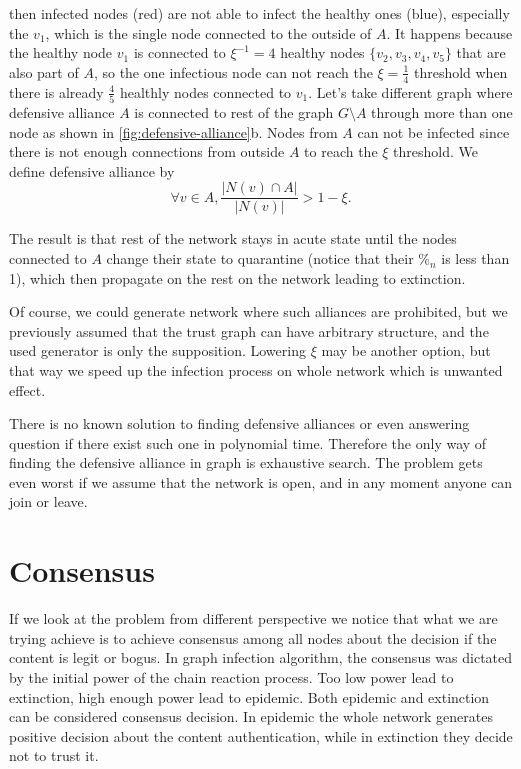\documentclass[nostrict]{szablonPG}
\begin{document}
then infected nodes (red) are not able to infect the healthy ones (blue), especially the $v_1$, which is the single node connected to the outside of $A$. It happens because the healthy node $v_1$ is connected to $\xi^{-1} = 4$ healthy nodes $\{v_2,v_3,v_4,v_5\}$ that are also part of $A$, so the one infectious node can not reach the $\xi = \frac{1}{4}$ threshold when there is already $\frac{4}{5}$ healthly nodes connected to $v_1$.
Let's take different graph where defensive alliance $A$ is connected to rest of the graph $G \setminus A$ through more than one node as shown in \ref{fig:defensive-alliance}b. Nodes from $A$ can not be infected since there is not enough connections from outside $A$ to reach the $\xi$ threshold. We define defensive alliance by \[\forall{v \in A}, \frac{|N(v) \cap A|}{|N(v)|} > 1 - \xi.\]

The result is that rest of the network stays in acute state until the nodes connected to $A$ change their state to quarantine (notice that their $\%_n$ is less than 1), which then propagate on the rest on the network leading to extinction. 

Of course, we could generate network where such alliances are prohibited, but we previously assumed that the trust graph can have arbitrary structure, and the used generator is only the supposition. Lowering $\xi$ may be another option, but that way we speed up the infection process on whole network which is unwanted effect.

There is no known solution to finding defensive alliances or even answering question if there exist such one in polynomial time. Therefore the only way of finding the defensive alliance in graph is exhaustive search. The problem gets even worst if we assume that the network is open, and in any moment anyone can join or leave. 

\section{Consensus}
If we look at the problem from different perspective we notice that what we are trying achieve is to achieve consensus among all nodes about the decision if the content is legit or bogus. In graph infection algorithm, the consensus was dictated by the initial power of the chain reaction process. Too low power lead to extinction, high enough power lead to epidemic. Both epidemic and extinction can be considered consensus decision. In epidemic the whole network generates positive decision about the content authentication, while in extinction they decide not to trust it. 
\end{document}
